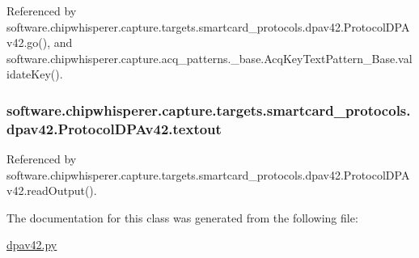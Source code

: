 Referenced by software.\+chipwhisperer.\+capture.\+targets.\+smartcard\+\_\+protocols.\+dpav42.\+Protocol\+D\+P\+Av42.\+go(), and software.\+chipwhisperer.\+capture.\+acq\+\_\+patterns.\+\_\+base.\+Acq\+Key\+Text\+Pattern\+\_\+\+Base.\+validate\+Key().

\hypertarget{classsoftware_1_1chipwhisperer_1_1capture_1_1targets_1_1smartcard__protocols_1_1dpav42_1_1ProtocolDPAv42_a9003187c95eb3e75f3383c51a0705950}{}
\subsubsection[{textout}]{\setlength{\rightskip}{0pt plus 5cm}software.\+chipwhisperer.\+capture.\+targets.\+smartcard\+\_\+protocols.\+dpav42.\+Protocol\+D\+P\+Av42.\+textout}\label{classsoftware_1_1chipwhisperer_1_1capture_1_1targets_1_1smartcard__protocols_1_1dpav42_1_1ProtocolDPAv42_a9003187c95eb3e75f3383c51a0705950}


Referenced by software.\+chipwhisperer.\+capture.\+targets.\+smartcard\+\_\+protocols.\+dpav42.\+Protocol\+D\+P\+Av42.\+read\+Output().



The documentation for this class was generated from the following file\+:\begin{DoxyCompactItemize}
\item 
\hyperlink{dpav42_8py}{dpav42.\+py}\end{DoxyCompactItemize}
